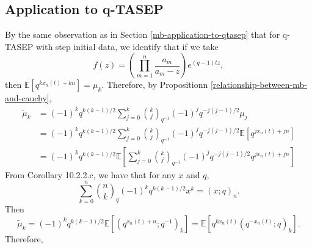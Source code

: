\subsection{Application to q-TASEP}
By the same observation as in Section \ref{mb-application-to-qtasep} that for q-TASEP with step initial data, we identify that if we take $$f(z) = \left( \prod_{m=1}^{n} \frac{a_m}{a_m - z} \right) e^{(q-1)tz},$$ then $\mathbb{E} \left[ q^{kx_{n}(t)+kn} \right] = \mu_k$. Therefore, by Propositionn \ref{relationship-between-mb-and-cauchy},
\begin{align*}
\tilde{\mu}_k &= (-1)^k q^{k(k-1)/2} \sum_{j=0}^k {k \choose j}_{q^{-1}} (-1)^j q^{-j(j-1)/2} \mu_j\\
&= (-1)^k q^{k(k-1)/2} \sum_{j=0}^k {k \choose j}_{q^{-1}} (-1)^j q^{-j(j-1)/2} \mathbb{E} \left[ q^{jx_{n}(t)+jn} \right]\\
&= (-1)^k q^{k(k-1)/2} \mathbb{E} \left[ \sum_{j=0}^k {k \choose j}_{q^{-1}} (-1)^j q^{-j(j-1)/2} q^{jx_{n}(t)+jn} \right]
\end{align*}
From \cite{} Corollary 10.2.2.c, we have that for any $x$ and $q$, $$\sum_{k=0}^{n} {n \choose k}_q (-1)^k q^{k(k-1)/2} x^k = (x;q)_n.$$ Then $$\tilde{\mu}_k = (-1)^k q^{k(k-1)/2} \mathbb{E} \left[ (q^{x_n(t)+n}; q^{-1})_k \right] = \mathbb{E} \left[ q^{kx_n(t)} (q^{-x_n(t)}; q)_k \right].$$
Therefore,
\begin{align*}

\end{align*}